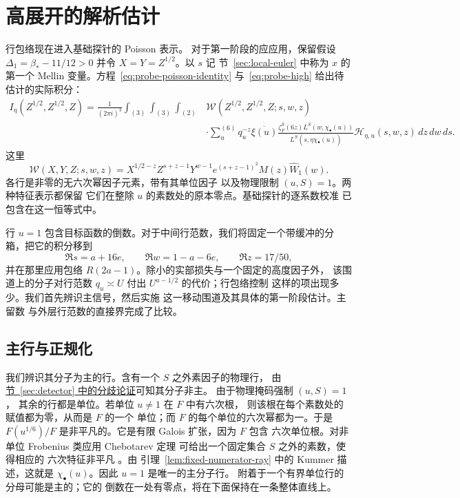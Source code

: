 \section{高展开的解析估计}
\label{sec:shared-analytic-estimates}

行包络现在进入基础探针的 Poisson 表示。
对于第一阶段的应应用，保留假设
$\Delta_1=\beta_*-11/12>0$ 并令
$X=Y=Z^{1/2}$。以 $s$ 记
节~\ref{sec:local-euler} 中称为 $x$ 的第一个 Mellin 变量。方程~\eqref{eq:probe-poisson-identity}
与~\eqref{eq:probe-high} 给出待估计的实际积分：
\[
\begin{split}
 I_\eta(Z^{1/2},Z^{1/2},Z)
 =\frac1{(2\pi i)^3}\int_{(3)}\int_{(3)}\int_{(2)}
 &\mathcal W(Z^{1/2},Z^{1/2},Z;s,w,z)\\
 &\cdot\sum_u^{(6)}q_u^{-z}\overline{\xi(u)}
 \frac{\zeta_F^S(6z)L^S(w,\chi_\bullet(u))}
      {L^S(s,\eta\overline{\chi_\bullet(u)})}
 \mathcal H_{\eta,u}(s,w,z)\,dz\,dw\,ds.
\end{split}
\]
这里
\[
 \mathcal W(X,Y,Z;s,w,z)=X^{1/2-z}Z^{s+z-1}Y^{w-1}
 e^{(s+z-1)^2}M(z)\widehat W_1(w).
\]
各行是非零的无六次幂因子元素，带有其单位因子
以及物理限制 $(u,S)=1$。两种特征表示都保留
它们在整除 $u$ 的素数处的原本零点。基础探针的逐系数校准
已包含在这一恒等式中。

行 $u=1$ 包含目标函数的倒数。对于中间行范数，我们将固定一个带缓冲的分箱，把它的积分移到
\[
 \Re s=a+16e,\qquad \Re w=1-a-6e,\qquad \Re z=17/50,
\]
并在那里应用包络 $R(2a-1)$。除小的实部损失与一个固定的高度因子外，
该围道上的分子对行范数 $q_u\asymp U$ 付出 $U^{a-1/2}$ 的代价；行包络控制
这样的项出现多少。我们首先辨识主信号，然后实施
这一移动围道及其具体的第一阶段估计。主留数
与外层行范数的直接界完成了比较。

\subsection{主行与正规化}

我们辨识其分子为主的行。含有一个 $S$ 之外素因子的物理行，
由 \hyperref[par:physical-row-ramification]{节~\ref*{sec:detector} 中的分歧论证}可知其分子非主。
由于物理掩码强制 $(u,S)=1$，
其余的行都是单位。若单位 $u\ne1$ 在 $F$ 中有六次根，
则该根在每个素数处的赋值都为零，从而是 $F$ 的一个
单位；而 $F$ 的每个单位的六次幂都为一。于是
$F(u^{1/6})/F$ 是非平凡的。它是有限 Galois 扩张，因为 $F$ 包含
六次单位根。对非单位 Frobenius 类应用 Chebotarev 定理
可给出一个固定集合 $S$ 之外的素数，使得相应的
六次特征非平凡 \cite[定理 1.1]{TZ}。由
引理~\ref{lem:fixed-numerator-ray} 中的 Kummer 描述，这就是
$\chi_\bullet(u)$。因此 $u=1$ 是唯一的主分子行。
附着于一个有界单位行的分母可能是主的；它的
倒数在一处有零点，将在下面保持在一条整体直线上。

